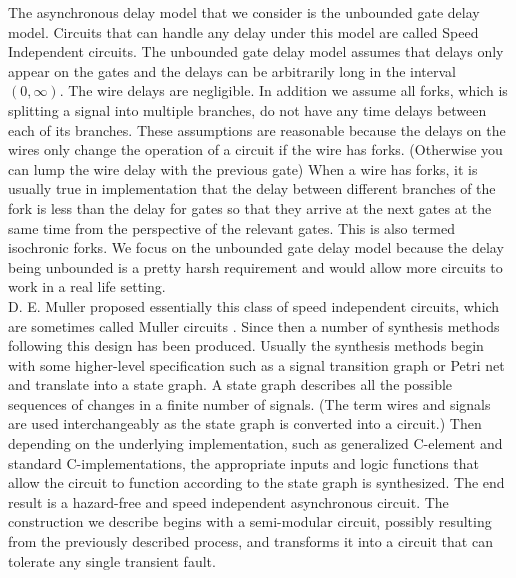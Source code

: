 \documentclass[12pt]{report}
\begin{document}
The asynchronous delay model that we consider is the unbounded gate delay model.  Circuits that can handle any delay under this model are called Speed Independent circuits. The unbounded gate delay model assumes that delays only appear on the gates and the delays can be arbitrarily long in the interval $(0,\infty)$.  The wire delays are negligible.  In addition we assume all forks, which is splitting a signal into multiple branches, do not have any time delays between each of its branches.  These assumptions are reasonable because the delays on the wires only change the operation of a circuit if the wire has forks.  (Otherwise you can lump the wire delay with the previous gate)  When a wire has forks, it is usually true in implementation that the delay between different branches of the fork is less than the delay for gates so that they arrive at the next gates at the same time from the perspective of the relevant gates.  This is also termed isochronic forks.  We focus on the unbounded gate delay model because the delay being unbounded is a pretty harsh requirement and would allow more circuits to work in a real life setting. \\ %

D. E. Muller proposed essentially this class of speed independent circuits, which are sometimes called Muller circuits \cite{Muller_59}.  Since then a number of synthesis methods following this design has been produced.  Usually the synthesis methods begin with some higher-level specification such as a signal transition graph or Petri net and translate into a state graph.  A state graph describes all the possible sequences of changes in a finite number of signals.  (The term wires and signals are used interchangeably as the state graph is converted into a circuit.)  Then depending on the underlying implementation, such as generalized C-element and standard C-implementations, the appropriate inputs and logic functions that allow the circuit to function according to the state graph is synthesized.  The end result is a hazard-free and speed independent asynchronous circuit.  The construction we describe begins with a semi-modular circuit, possibly resulting from the previously described process, and transforms it into a circuit that can tolerate any single transient fault.
     
\end{document}
